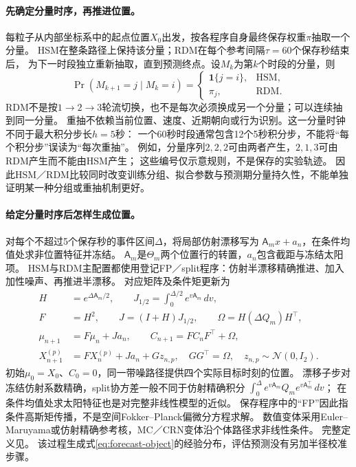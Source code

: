 \paragraph{先确定分量时序，再推进位置。}
每粒子从内部坐标系中的起点位置$X_0$出发，按各程序自身最终保存权重$\pi$抽取一个分量。
HSM在整条路径上保持该分量；RDM在每个参考间隔$\tau=60$个保存秒结束后，
为下一时段独立重新抽取，直到预测终点。设$M_k$为第$k$个时段的分量，则
\begin{equation}\label{eq:mode-update-rules}
 \Pr(M_{k+1}=j\mid M_k=i)=
 \begin{cases}\mathbf1\{j=i\},&\text{HSM},\\ \pi_j,&\text{RDM}.
 \end{cases}
\end{equation}
RDM不是按$1\to2\to3$轮流切换，也不是每次必须换成另一个分量；可以连续抽到同一分量。
重抽不依赖当前位置、速度、近期朝向或行为识别。这一分量时钟不同于最大积分步长$h=5$秒：
一个60秒时段通常包含12个5秒积分步，不能将“每个积分步”误读为“每次重抽”。
例如，分量序列$2,2,2$可由两者产生，$2,1,3$可由RDM产生而不能由HSM产生；
这些编号仅示意规则，不是保存的实验轨迹。
因此HSM／RDM比较同时改变训练分组、拟合参数与预测期分量持久性，不能单独证明某一种分组或重抽机制更好。

\paragraph{给定分量时序后怎样生成位置。}
对每个不超过5个保存秒的事件区间$\Delta$，将局部仿射漂移写为
$\mathsf A_mx+a_n$，在条件均值处求非位置特征并冻结。
$\mathsf A_m$是$\Theta_m$两个位置行的转置，$a_n$包含截距与冻结太阳项。
HSM与RDM主配置都使用登记FP／split程序：仿射半漂移精确推进、加入加性噪声、再推进半漂移。
对应矩阵及条件矩更新为
\begin{align}
 H&=e^{\Delta\mathsf A_m/2},\qquad
 J_{1/2}=\int_0^{\Delta/2} e^{v\mathsf A_m}\,dv,\nonumber\\
 F&=H^2,\qquad J=(I+H)J_{1/2},\qquad
 \Omega=H(\Delta Q_m)H^\top,
 \label{eq:main-affine-kernel}\\
 \mu_{n+1}&=F\mu_n+Ja_n,\qquad
 C_{n+1}=FC_nF^\top+\Omega,\label{eq:main-moment-update}\\
 X_{n+1}^{(p)}&=FX_n^{(p)}+Ja_n+Gz_{n,p},\quad
 GG^\top=\Omega,\quad z_{n,p}\sim\mathcal N(0,I_2).
 \label{eq:main-particle-update}
\end{align}
初始$\mu_0=X_0$、$C_0=0$，同一带噪路径提供四个实际目标时刻的位置。
漂移子步对冻结仿射系数精确，split协方差一般不同于仿射精确积分
$\int_0^\Delta e^{v\mathsf A_m}Q_m e^{v\mathsf A_m^\top}\,dv$；
在条件均值处求太阳特征也是对完整非线性模型的近似。
保存程序中的“FP”因此指条件高斯矩传播，不是空间Fokker--Planck偏微分方程求解。
数值变体采用Euler--Maruyama或仿射精确参考核，MC／CRN变体沿个体路径求非线性条件。
完整定义见。
该过程生成式\eqref{eq:forecast-object}的经验分布，评估预测没有另加半径校准步骤。
